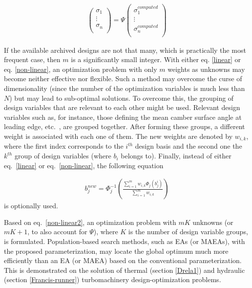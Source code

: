 \begin{eqnarray}
		\left( {\begin{array}{c}
 		\sigma _1  \\
 		\vdots  \\
 		\sigma _n  \\
 		\end{array} } \right) =
 		\Psi  
 		\left( {\begin{array}{c}
 		\sigma _1^{computed}  \\
 		\vdots  \\
 		\sigma _n^{computed}  \\
 		\end{array} } \right)
   \label{cdf-matrix} 
\end{eqnarray}


If the available archived designs are not that many, which is practically the most frequent case, then $m$ is a significantly small integer.  With either eq. \ref{linear} or eq. \ref{non-linear}, an optimization problem with only $m$ weights as unknowns may become neither effective nor flexible. Such a method may overcome the curse of dimensionality (since the number of the optimization variables is  much less than $N$) but may lead to sub-optimal solutions. To overcome this, the grouping of design variables that are relevant to each other might be used. Relevant design variables such as, for instance, those defining the mean camber surface angle at leading edge, etc.\ , are grouped together. After forming these groups, a different weight is associated with each one of them. The new weights are denoted by $w_{i,k}$, where the first index corresponds to the $i^{th}$ design basis and the second one the $k^{th}$ group of design variables (where $b_i$ belongs to). Finally, instead of either eq.\ \ref{linear} or eq.\ \ref{non-linear}, the following equation


\begin{eqnarray}
   b_j^{new} = \Phi _j^{-1} (\frac{\sum_{i=1}^{m}w_{i,k} \Phi _j(b_j^i)}{\sum_{i=1}^{m}w_{i,k} }) 
   \label{non-linear2} 
\end{eqnarray}
is optionally used. 

Based on eq.\ \ref{non-linear2}, an optimization problem with $m  K$ unknowns (or $m K\!+\!1$, to also account for $\Psi$), where $K$ is the number of design variable groups, is formulated. Population-based search methods, such as EAs (or MAEAs), with the proposed parameterization, may locate the global optimum much more efficiently than an EA (or MAEA) based on the conventional parameterization. This is demonstrated on the solution of  thermal (section \ref{Drela1}) and hydraulic (section \ref{Francis-runner}) turbomachinery design-optimization problems. 


